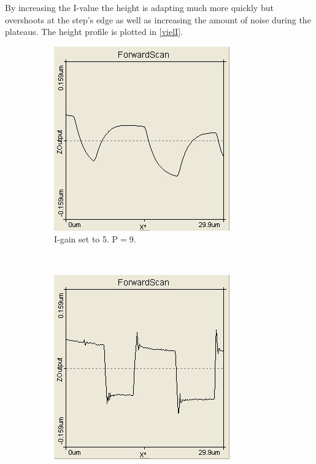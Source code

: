 \documentclass[paper=a4,fontsize=10pt,DIV=18,twocolumn,parskip=half]{scrartcl}
\numberwithin{equation}{section}    %
\begin{document}
By increasing the I-value the height is adapting much more quickly but 
overshoots at the step's edge as well as increasing the amount of noise during 
the plateaus. The height profile is plotted in \ref{vielI}.

\begin{figure}
    \centering
    \begin{subfigure}{0.45\columnwidth}
         \includegraphics[width=\textwidth]{Bilder/wenigI}
        \caption{I-gain set to 5. $\mathrm{P}=9$. }
        \label{wenigI}
    \end{subfigure}
    ~
    \begin{subfigure}{0.45\columnwidth}
        \includegraphics[width=\textwidth]{Bilder/vielI}

\end{subfigure}
\end{figure}
\end{document}
